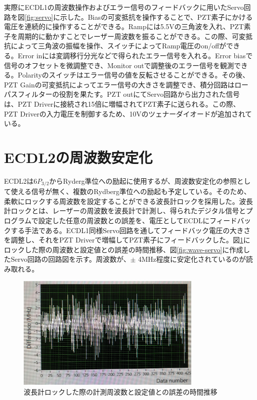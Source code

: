 \documentclass[dvipdfmx]{jsreport}
\begin{document}
実際にECDL1の周波数操作およびエラー信号のフィードバックに用いたServo回路を図\ref{fig:servo}に示した。Biasの可変抵抗を操作することで、PZT素子にかける電圧を連続的に操作することができる。Rampには5.5Vの三角波を入れ、PZT素子を周期的に動かすことでレーザー周波数を振ることができる。この際、可変抵抗によって三角波の振幅を操作、スイッチによってRamp電圧のon/offができる。Error inには変調移行分光などで得られたエラー信号を入れる。Error biasで信号のオフセットを微調整でき、Monitor outで調整後のエラー信号を観測できる。Polarityのスイッチはエラー信号の値を反転させることができる。その後、PZT Gainの可変抵抗によってエラー信号の大きさを調整でき、積分回路はローパスフィルターの役割を果たす。PZT outにてServo回路から出力された信号は、PZT Driverに接続され15倍に増幅されてPZT素子に送られる。この際、PZT Driverの入力電圧を制御するため、10Vのツェナーダイオードが追加されている。


\section{ECDL2の周波数安定化}
ECDL2は$6P_{3/2}$からRyderg準位への励起に使用するが、周波数安定化の参照として使える信号が無く、複数のRydberg準位への励起も予定している。そのため、柔軟にロックする周波数を設定することができる波長計ロックを採用した。波長計ロックとは、レーザーの周波数を波長計で計測し、得られたデジタル信号とプログラムで設定した任意の周波数との誤差を、電圧としてECDLにフィードバックする手法である。ECDL1同様Servo回路を通してフィードバック電圧の大きさを調整し、それをPZT Driverで増幅してPZT素子にフィードバックした。図\ref{fig:wave-lock}にロックした際の周波数と設定値との誤差の時間推移、図\ref{fig:wave-servo}に作成したServo回路の回路図を示す。周波数が、$\pm$ 4MHz程度に安定化されているのが読み取れる。

\begin{figure}[hbtp]
\centering
\includegraphics[width=0.8\textwidth]{images/wave_lock.jpg}
\caption{\label{fig:wave-lock}波長計ロックした際の計測周波数と設定値との誤差の時間推移}
\end{figure}
\end{document}
